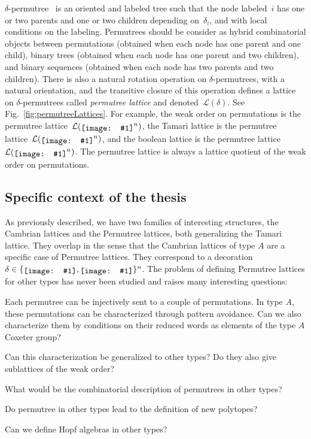 \documentclass[a4paper,12pt]{article}
\newcommand{\cL}{\mathcal{L}} %
\newcommand{\defn}[1]{\emph{\color{blue} #1}} %
\newcommand{\includeSymbol}[1]{\ensuremath{%
	\mathchoice
		{\raisebox{-.7mm}{\texttt{[image: \#1]}}}	
		{\raisebox{-.7mm}{\texttt{[image: \#1]}}}
		{\raisebox{-.6mm}{\texttt{[image: \#1]}}}
		{\raisebox{-.5mm}{\texttt{[image: \#1]}}}
}}
\newcommand{\noneCirc}{\includeSymbol{none}}
\newcommand{\upCirc}{\includeSymbol{up}}
\newcommand{\downCirc}{\includeSymbol{down}}
\newcommand{\upDownCirc}{\includeSymbol{updown}}
\newcommand{\viviane}[1]{\todo[color=red!30]{#1}}
\begin{document}
{$\delta$-permutree}~\cite{PilaudPons-permutrees} is an oriented and labeled tree such that the node labeled~$i$ has one or two parents and one or two children depending on~$\delta_i$, and with local conditions on the labeling.
Permutrees should be consider as hybrid combinatorial objects between permutations (obtained when each node has one parent and one child), binary trees (obtained when each node has one parent and two children), and binary sequences (obtained when each node has two parents and two children).
There is also a natural rotation operation on $\delta$-permutrees, with a natural orientation, and the transitive closure of this operation defines a lattice on $\delta$-permutrees called \defn{permutree lattice} and denoted~$\cL(\delta)$.
See Fig.~\ref{fig:permutreeLattices}.
For example, the weak order on permutations is the permutree lattice~$\cL(\noneCirc^n)$, the Tamari lattice is the permutree lattice~$\cL(\downCirc^n)$, and the boolean lattice is the permutree lattice~$\cL(\upDownCirc^n)$.
The permutree lattice is always a lattice quotient of the weak order on permutations.

\viviane{Add something about polytopes and Hopf algebras}

\subsection{Specific context of the thesis}

As previously described, we have two families of interesting structures, the Cambrian lattices and the Permutree lattices, both generalizing the Tamari lattice. They overlap in the sense that the Cambrian lattices of type $A$ are a specific case of Permutree lattices. They correspond to a decoration $\delta \in \lbrace \upCirc, \downCirc \rbrace^n$. The problem of defining Permutree lattices for other types has never been studied and raises many interesting questions:

\begin{compactitem}
\item Each permutree can be injectively sent to a couple of permutations. In type $A$, these permutations can be characterized through pattern avoidance. Can we also characterize them by conditions on their reduced words as elements of the type $A$ Coxeter group? 
\item Can this characterization be generalized to other types? Do they also give sublattices of the weak order?
\item What would be the combinatorial description of permutrees in other types?
\item Do permutree in other types lead to the definition of new polytopes?
\item Can we define Hopf algebras in other types?
\end{compactitem}
\end{document}
